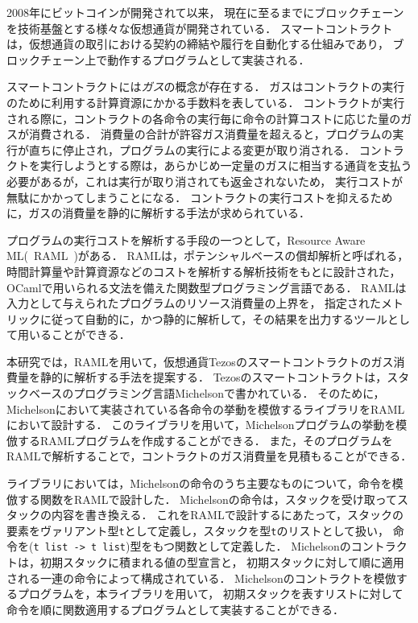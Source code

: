 \documentclass{kuisthesis}
\date{2021年2月2日}
\begin{document}
\maketitle

\begin{jabstract}
2008年にビットコインが開発されて以来，
現在に至るまでにブロックチェーンを技術基盤とする様々な仮想通貨が開発されている．
スマートコントラクトは，仮想通貨の取引における契約の締結や履行を自動化する仕組みであり，
ブロックチェーン上で動作するプログラムとして実装される．

スマートコントラクトには\emph{ガス}の概念が存在する．
ガスはコントラクトの実行のために利用する計算資源にかかる手数料を表している．
コントラクトが実行される際に，コントラクトの各命令の実行毎に命令の計算コストに応じた量のガスが消費される．
消費量の合計が許容ガス消費量を超えると，プログラムの実行が直ちに停止され，プログラムの実行による変更が取り消される．
コントラクトを実行しようとする際は，あらかじめ一定量のガスに相当する通貨を支払う必要があるが，これは実行が取り消されても返金されないため，
実行コストが無駄にかかってしまうことになる．
コントラクトの実行コストを抑えるために，ガスの消費量を静的に解析する手法が求められている．

プログラムの実行コストを解析する手段の一つとして，Resource Aware ML(\ RAML\ )がある．
RAMLは，ポテンシャルベースの償却解析と呼ばれる，時間計算量や計算資源などのコストを解析する解析技術をもとに設計された，
OCamlで用いられる文法を備えた関数型プログラミング言語である．
RAMLは入力として与えられたプログラムのリソース消費量の上界を，
指定されたメトリックに従って自動的に，かつ静的に解析して，その結果を出力するツールとして用いることができる．

本研究では，RAMLを用いて，仮想通貨Tezosのスマートコントラクトのガス消費量を静的に解析する手法を提案する．
Tezosのスマートコントラクトは，スタックベースのプログラミング言語Michelsonで書かれている．
そのために，Michelsonにおいて実装されている各命令の挙動を模倣するライブラリをRAMLにおいて設計する．
このライブラリを用いて，Michelsonプログラムの挙動を模倣するRAMLプログラムを作成することができる．
また，そのプログラムをRAMLで解析することで，コントラクトのガス消費量を見積もることができる．

ライブラリにおいては，Michelsonの命令のうち主要なものについて，命令を模倣する関数をRAMLで設計した．
Michelsonの命令は，スタックを受け取ってスタックの内容を書き換える．
これをRAMLで設計するにあたって，スタックの要素をヴァリアント型{\tt t}として定義し，スタックを型{\tt t}のリストとして扱い，
命令を({\tt t list -> t list})型をもつ関数として定義した．
Michelsonのコントラクトは，初期スタックに積まれる値の型宣言と，
初期スタックに対して順に適用される一連の命令によって構成されている．
Michelsonのコントラクトを模倣するプログラムを，本ライブラリを用いて，
初期スタックを表すリストに対して命令を順に関数適用するプログラムとして実装することができる．


\end{jabstract}
\end{document}
